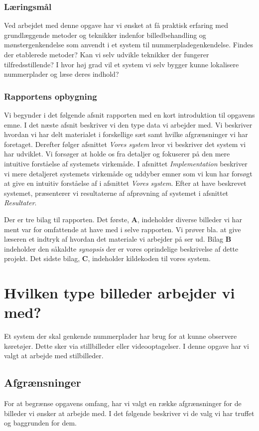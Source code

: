 \subsubsection*{Læringsmål}
Ved arbejdet med denne opgave har vi ønsket at få praktisk erfaring med grundlæggende metoder og teknikker indenfor billedbehandling og mønstergenkendelse som anvendt i et system til nummerpladegenkendelse. Findes der etablerede metoder? Kan vi selv udvikle teknikker der fungerer tilfredsstillende? I hvor høj grad vil et system vi selv bygger kunne lokalisere nummerplader og læse deres indhold?

\subsubsection*{Rapportens opbygning}
Vi begynder i det følgende afsnit rapporten med en kort introduktion til opgavens emne. I det næste afsnit beskriver vi den type data vi arbejder med. Vi beskriver hvordan vi har delt materialet i forskellige sæt samt hvilke afgrænsninger vi har foretaget. Derefter følger afsnittet \textit{Vores system} hvor vi beskriver det system vi har udviklet. Vi forsøger at holde os fra detaljer og fokuserer på den mere intuitive forståelse af systemets virkemåde. I afsnittet \textit{Implementation} beskriver vi mere detaljeret systemets virkemåde og uddyber emner som vi kun har forsøgt at give en intuitiv forståelse af i afsnittet \textit{Vores system}. Efter at have beskrevet systemet, præsenterer vi resultaterne af afprøvning af systemet i afsnittet \textit{Resultater}.

Der er tre bilag til rapporten. Det første, \textbf{A}, indeholder diverse billeder vi har ment var for omfattende at have med i selve rapporten. Vi prøver bla. at give læseren et indtryk af hvordan det materiale vi arbejder på ser ud. Bilag \textbf{B} indeholder den såkaldte \textit{synopsis} der er vores oprindelige beskrivelse af dette projekt. Det sidste bilag, \textbf{C}, indeholder kildekoden til vores system.


\section{Hvilken type billeder arbejder vi med?}
\label{sec:data}
Et system der skal genkende nummerplader har brug for at kunne observere køretøjer. Dette sker via stillbilleder eller videooptagelser. I denne opgave har vi valgt at arbejde med stilbilleder.

\subsection{Afgrænsninger}
For at begrænse opgavens omfang, har vi valgt en række afgrænsninger for de billeder vi ønsker at arbejde med. I det følgende beskriver vi de valg vi har truffet og baggrunden for dem.

